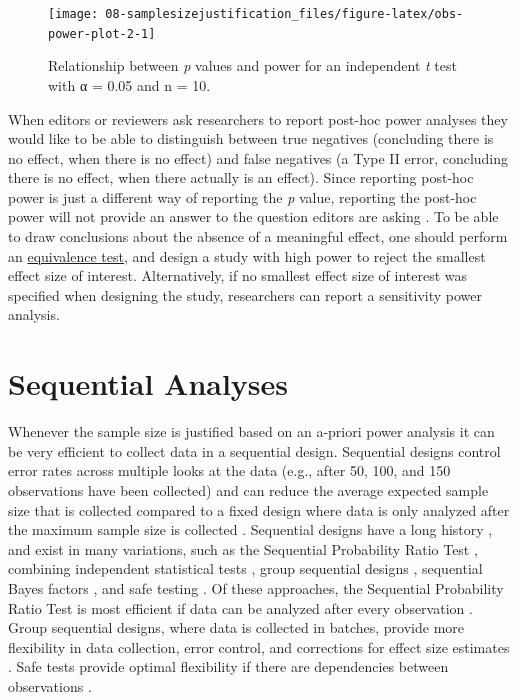 \documentclass[
  oneside]{book}
\begin{document}
\begin{figure}

{\centering \texttt{[image: 08-samplesizejustification\_files/figure-latex/obs-power-plot-2-1]} 

}

\caption{Relationship between \emph{p} values and power for an independent \emph{t} test with α = 0.05 and n = 10.}\label{fig:obs-power-plot-2}
\end{figure}

When editors or reviewers ask researchers to report post-hoc power analyses they would like to be able to distinguish between true negatives (concluding there is no effect, when there is no effect) and false negatives (a Type II error, concluding there is no effect, when there actually is an effect). Since reporting post-hoc power is just a different way of reporting the \emph{p} value, reporting the post-hoc power will not provide an answer to the question editors are asking \citep{hoenig_abuse_2001, lenth_post_2007, yuan_post_2005, schulz_sample_2005}. To be able to draw conclusions about the absence of a meaningful effect, one should perform an \protect\hyperlink{equivalencetest}{equivalence test}, and design a study with high power to reject the smallest effect size of interest. Alternatively, if no smallest effect size of interest was specified when designing the study, researchers can report a sensitivity power analysis.

\hypertarget{sequentialsamplesize}{%
\section{Sequential Analyses}\label{sequentialsamplesize}}

Whenever the sample size is justified based on an a-priori power analysis it can be very efficient to collect data in a sequential design. Sequential designs control error rates across multiple looks at the data (e.g., after 50, 100, and 150 observations have been collected) and can reduce the average expected sample size that is collected compared to a fixed design where data is only analyzed after the maximum sample size is collected \citep{wassmer_group_2016, proschan_statistical_2006}. Sequential designs have a long history \citep{dodge_method_1929}, and exist in many variations, such as the Sequential Probability Ratio Test \citep{wald_sequential_1945}, combining independent statistical tests \citep{westberg_combining_1985}, group sequential designs \citep{jennison_group_2000}, sequential Bayes factors \citep{schonbrodt_sequential_2017}, and safe testing \citep{grunwald_safe_2019}. Of these approaches, the Sequential Probability Ratio Test is most efficient if data can be analyzed after every observation \citep{schnuerch_controlling_2020}. Group sequential designs, where data is collected in batches, provide more flexibility in data collection, error control, and corrections for effect size estimates \citep{wassmer_group_2016}. Safe tests provide optimal flexibility if there are dependencies between observations \citep{ter_schure_accumulation_2019}.
\end{document}

